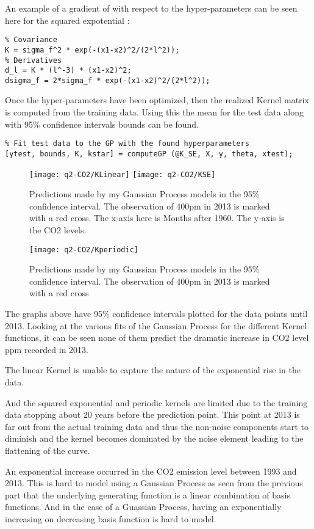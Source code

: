 \documentclass{article}
\begin{document}
\begin{enumerate}
	An example of a gradient of with respect to the hyper-parameters can be seen here for the squared expotential \cite{rasmussen2006gaussian}:
	
	\begin{lstlisting}
% Covariance
K = sigma_f^2 * exp(-(x1-x2)^2/(2*l^2));
% Derivatives
d_l = K * (l^-3) * (x1-x2)^2; 
dsigma_f = 2*sigma_f * exp(-(x1-x2)^2/(2*l^2));
	\end{lstlisting}
	
	Once the hyper-parameters have been optimized, then the realized Kernel matrix is computed from the training data. Using this the mean for the test data along with 95\% confidence intervals bounds can be found. 
	
\begin{lstlisting}
% Fit test data to the GP with the found hyperparameters
[ytest, bounds, K, kstar] = computeGP (@K_SE, X, y, theta, xtest);
\end{lstlisting}
	
	\begin{figure}[h!]
		\centering
		\texttt{[image: q2-CO2/KLinear]}
		\texttt{[image: q2-CO2/KSE]}
		\caption{Predictions made by my Gaussian Process models in the 95\% confidence interval. The observation of 400pm in 2013 is marked with a red cross. The x-axis here is Months after 1960. The y-axis is the CO2 levels.}
	\end{figure}
	
		\begin{figure}[h!]
		\centering
		\texttt{[image: q2-CO2/Kperiodic]}
		\caption{Predictions made by my Gaussian Process models in the 95\% confidence interval. The observation of 400pm in 2013 is marked with a red cross}
	\end{figure}
	
	The graphs above have 95\% confidence intervals plotted for the data points until 2013. Looking at the various fits of the Gaussian Process for the different Kernel functions, it can be seen none of them predict the dramatic increase in CO2 level ppm recorded in 2013.
	
	The linear Kernel is unable to capture the nature of the exponential rise in the data.
	
	And the squared exponential and periodic kernels are limited due to the training data stopping about 20 years before the prediction point. This point at 2013 is far out from the actual training data and thus the non-noise components start to diminish and the kernel becomes dominated by the noise element leading to the flattening of the curve.  
	
	  An exponential increase occurred in the CO2 emission level between 1993 and 2013. This is hard to model using a Gaussian Process as seen from the previous part that the underlying generating function is a linear combination of basis functions. And in the case of a Guassian Process, having an exponentially increasing on decreasing basis function is hard to model.
\end{enumerate}
\end{document}
